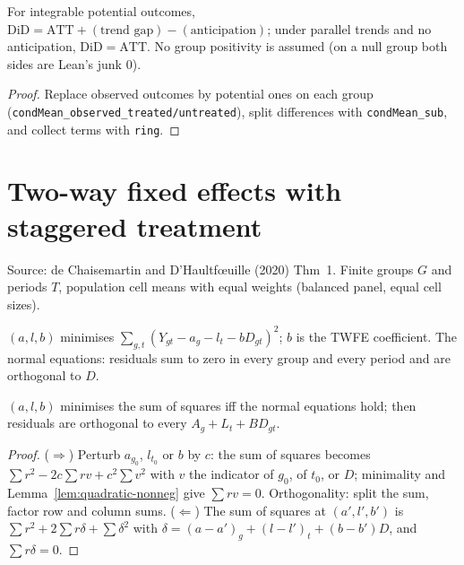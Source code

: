 \begin{theorem}
\label{thm:did}
\leanok
{}
For integrable potential outcomes, $\mathrm{DiD} = \mathrm{ATT} + (\text{trend gap}) - (\text{anticipation})$; under parallel
trends and no anticipation, $\mathrm{DiD} = \mathrm{ATT}$. No group positivity is assumed (on a null group both sides
are Lean's junk $0$).
\end{theorem}
\begin{proof}
\leanok
{}
Replace observed outcomes by potential ones on each group (\texttt{condMean\_observed\_treated/untreated}), split
differences with \texttt{condMean\_sub}, and collect terms with \texttt{ring}.
\end{proof}

\section{Two-way fixed effects with staggered treatment}
\label{sec:twfe}

Source: de Chaisemartin and D'Haultf\oe uille (2020) Thm~1. Finite groups $G$ and periods $T$, population cell
means with equal weights (balanced panel, equal cell sizes).

\begin{definition}
\label{def:twfe}
\leanok
$(a, l, b)$ minimises $\sum_{g,t}(Y_{gt} - a_g - l_t - bD_{gt})^2$; $b$ is the TWFE coefficient. The normal
equations: residuals sum to zero in every group and every period and are orthogonal to $D$.
\end{definition}

\begin{lemma}
\label{lem:twfe-foc}
\leanok
{}
$(a,l,b)$ minimises the sum of squares iff the normal equations hold; then residuals are orthogonal to every
$A_g + L_t + BD_{gt}$.
\end{lemma}
\begin{proof}
\leanok
{}
($\Rightarrow$) Perturb $a_{g_0}$, $l_{t_0}$ or $b$ by $c$: the sum of squares becomes
$\sum r^2 - 2c\sum rv + c^2\sum v^2$ with $v$ the indicator of $g_0$, of $t_0$, or $D$; minimality and
Lemma~\ref{lem:quadratic-nonneg} give $\sum rv = 0$. Orthogonality: split the sum, factor row and column sums.
($\Leftarrow$) The sum of squares at $(a',l',b')$ is $\sum r^2 + 2\sum r\delta + \sum\delta^2$ with
$\delta = (a-a')_g + (l-l')_t + (b-b')D$, and $\sum r\delta = 0$.
\end{proof}


